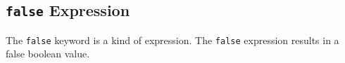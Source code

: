 
\subsection{\texttt{false} Expression}
{
	The \texttt{false} keyword is a kind of expression.
	The \texttt{false} expression results in a false boolean value.
}

